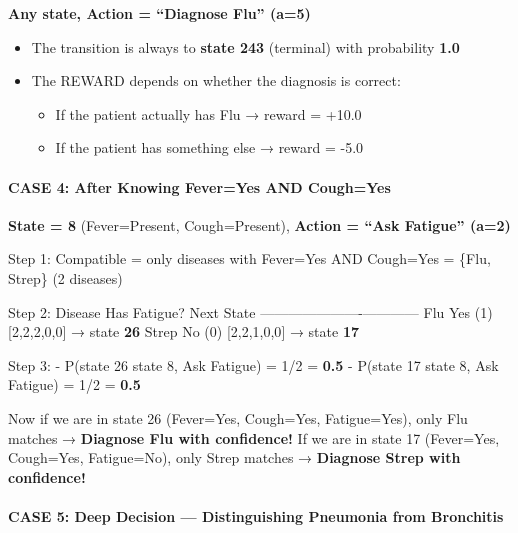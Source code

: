 \documentclass[
]{article}
\providecommand{\tightlist}{%
  \setlength{\itemsep}{0pt}\setlength{\parskip}{0pt}}
\begin{document}
\textbf{Any state, Action = ``Diagnose Flu'' (a=5)}

\begin{itemize}
\tightlist
\item
  The transition is always to \textbf{state 243} (terminal) with
  probability \textbf{1.0}
\item
  The REWARD depends on whether the diagnosis is correct:

  \begin{itemize}
  \tightlist
  \item
    If the patient actually has Flu → reward = +10.0
  \item
    If the patient has something else → reward = -5.0
  \end{itemize}
\end{itemize}

\hypertarget{case-4-after-knowing-feveryes-and-coughyes}{%
\paragraph{CASE 4: After Knowing Fever=Yes AND
Cough=Yes}\label{case-4-after-knowing-feveryes-and-coughyes}}

\textbf{State = 8} (Fever=Present, Cough=Present), \textbf{Action =
``Ask Fatigue'' (a=2)}

Step 1: Compatible = only diseases with Fever=Yes AND Cough=Yes = \{Flu,
Strep\} (2 diseases)

Step 2: \textbar{} Disease \textbar{} Has Fatigue? \textbar{} Next State
\textbar{}
\textbar---------\textbar-------------\textbar------------\textbar{}
\textbar{} Flu \textbar{} Yes (1) \textbar{} {[}2,2,2,0,0{]} → state
\textbf{26} \textbar{} \textbar{} Strep \textbar{} No (0) \textbar{}
{[}2,2,1,0,0{]} → state \textbf{17} \textbar{}

Step 3: - P(state 26 \textbar{} state 8, Ask Fatigue) = 1/2 =
\textbf{0.5} - P(state 17 \textbar{} state 8, Ask Fatigue) = 1/2 =
\textbf{0.5}

Now if we are in state 26 (Fever=Yes, Cough=Yes, Fatigue=Yes), only Flu
matches → \textbf{Diagnose Flu with confidence!} If we are in state 17
(Fever=Yes, Cough=Yes, Fatigue=No), only Strep matches →
\textbf{Diagnose Strep with confidence!}

\hypertarget{case-5-deep-decision-distinguishing-pneumonia-from-bronchitis}{%
\paragraph{CASE 5: Deep Decision --- Distinguishing Pneumonia from
Bronchitis}\label{case-5-deep-decision-distinguishing-pneumonia-from-bronchitis}}
\end{document}
